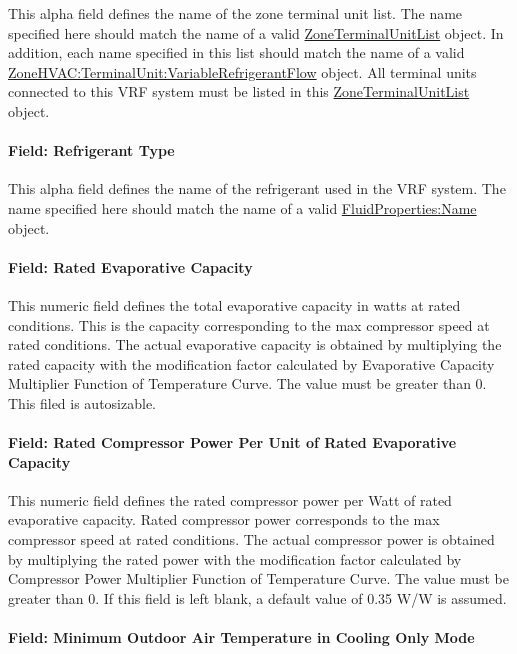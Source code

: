 This alpha field defines the name of the zone terminal unit list. The name specified here should match the name of a valid \hyperref[zoneterminalunitlist]{ZoneTerminalUnitList} object. In addition, each name specified in this list should match the name of a valid \hyperref[zonehvacterminalunitvariablerefrigerantflow]{ZoneHVAC:TerminalUnit:VariableRefrigerantFlow} object. All terminal units connected to this VRF system must be listed in this \hyperref[zoneterminalunitlist]{ZoneTerminalUnitList} object.

\paragraph{Field: Refrigerant Type}

This alpha field defines the name of the refrigerant used in the VRF system. The name specified here should match the name of a valid \hyperref[fluidpropertiesname]{FluidProperties:Name} object.

\paragraph{Field: Rated Evaporative Capacity}

This numeric field defines the total evaporative capacity in watts at rated conditions. This is the capacity corresponding to the max compressor speed at rated conditions. The actual evaporative capacity is obtained by multiplying the rated capacity with the modification factor calculated by Evaporative Capacity Multiplier Function of Temperature Curve. The value must be greater than 0. This filed is autosizable.

\paragraph{Field: Rated Compressor Power Per Unit of Rated Evaporative Capacity}

This numeric field defines the rated compressor power per Watt of rated evaporative capacity. Rated compressor power corresponds to the max compressor speed at rated conditions. The actual compressor power is obtained by multiplying the rated power with the modification factor calculated by Compressor Power Multiplier Function of Temperature Curve. The value must be greater than 0. If this field is left blank, a default value of 0.35 W/W is assumed.

\paragraph{Field: Minimum Outdoor Air Temperature in Cooling Only Mode}

